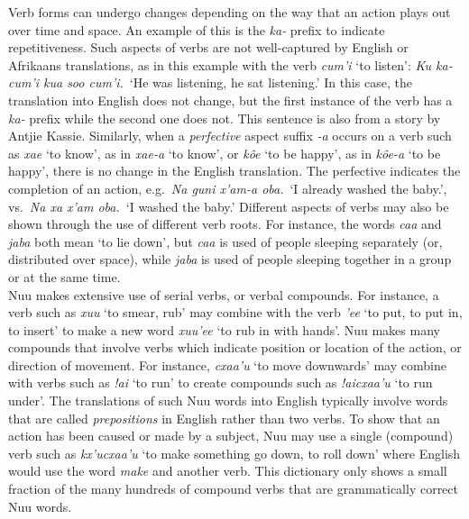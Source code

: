 Verb forms can undergo changes depending on the way that an action
plays out over time and space. An example of this is the \emph{ka-}
prefix to indicate repetitiveness. Such aspects of verbs are not
well-captured by English or Afrikaans translations, as in this example
with the verb \emph{cum'i} `to listen': \emph{Ku ka-cum'i kua soo
cum'i.}\ `He was listening, he sat listening.' In this case, the
translation into English does not change, but the first instance of
the verb has a \emph{ka-} prefix while the second one does not. This
sentence is also from a story by Antjie Kassie. Similarly, when a
\emph{perfective} aspect suffix \emph{-a} occurs on a verb such as
\emph{\textipa{\textdoublevertline}xae} `to know', as in
\emph{\textipa{\textdoublevertline}xae-a} `to know', or \emph{k\^{o}e}
`to be happy', as in \emph{k\^{o}e-a} `to be happy', there is no
change in the English translation. The perfective indicates the
completion of an action, e.g.\ \emph{Na g\textipa{\textvertline}uni
\textipa{\textdoublevertline}x'am-a \textipa{\textvertline}oba.}\ `I
already washed the baby.', vs.\ \emph{Na xa
\textipa{\textdoublevertline}x'am \textipa{\textvertline}oba.}\ `I
washed the baby.' Different aspects of verbs may also be shown through
the use of different verb roots. For instance, the words \emph{caa}
and \emph{jaba} both mean `to lie down', but \emph{caa} is used of
people sleeping separately (or, distributed over space), while
\emph{jaba} is used of people sleeping together in a group or at the
same time.\\

N\textipa{\textvertline}uu makes extensive use of serial verbs, or
verbal compounds. For instance, a verb such as \emph{xuu}
`to smear, rub' may combine with the verb
\emph{\textipa{\textvertline}'ee} `to put, to put in, to insert' to
make a new word \emph{xuu\textipa{\textvertline}'ee} `to
rub in with hands'.  N\textipa{\textvertline}uu makes many compounds
that involve verbs which indicate position or location of the action,
or direction of movement. For instance, \emph{cxaa'u} `to move
downwards' may combine with verbs such as \emph{!ai} `to run' to
create compounds such as \emph{!aicxaa'u} `to run under'. The
translations of such N\textipa{\textvertline}uu words into English
typically involve words that are called \emph{prepositions} in English
rather than two verbs. To show that an action has been caused or made
by a subject, N\textipa{\textvertline}uu may use a single (compound)
verb such as \emph{kx'ucxaa'u} `to make something go down, to roll
down' where English would use the word \emph{make} and another verb. This
dictionary only shows a small fraction of the many hundreds of
compound verbs that are grammatically correct
N\textipa{\textvertline}uu words.\\


